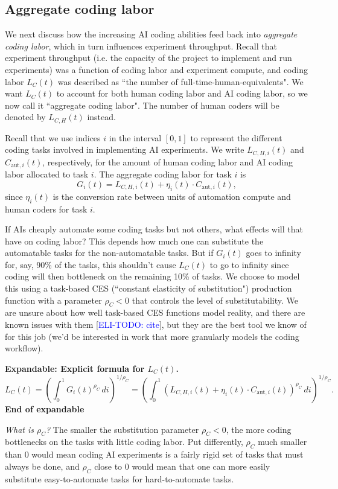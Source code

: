 \documentclass{article}
\theoremstyle{definition}
\newcommand{\ETODO}[1]{\textcolor{blue}{ELI-TODO: #1}}
\newcommand{\ESUG}[1]{\textcolor{purple}{ELI-SUGGESTION: #1}}
\newcommand{\ASUG}[1]{\textcolor{magenta}{ALEX-SUGGESTION: #1}}
\begin{document}
\subsection{Aggregate coding labor} \label{Aggregate coding labor}

We next discuss how the increasing AI coding abilities feed back into \textit{aggregate coding labor}, which in turn influences experiment throughput. Recall that experiment throughput (i.e. the capacity of the project to implement and run experiments) was a function of coding labor and experiment compute, and coding labor $L_C(t)$ was described as ``the number of full-time-human-equivalents". We want $L_C(t)$ to account for both human coding labor and AI coding labor, so we now call it ``aggregate coding labor". The number of human coders will be denoted by $L_{C,H}(t)$ instead.

Recall that we use indices $i$ in the interval $[0,1]$ to represent the different coding tasks involved in implementing AI experiments. We write $L_{C,H,i}(t)$ and $C_{\text{aut},i}(t)$, respectively, for the amount of human coding labor and AI coding labor allocated to task $i$. The aggregate coding labor for task $i$ is
\[ G_i(t) = L_{C,H,i}(t) + \eta_i(t) \cdot C_{\text{aut},i}(t),\]
since $\eta_i(t)$ is the conversion rate between units of automation compute and human coders for task $i$.

If AIs cheaply automate some coding tasks but not others, what effects will that have on coding labor? This depends how much one can substitute the automatable tasks for the non-automatable tasks. But if $G_i(t)$ goes to infinity for, say, 90\% of the tasks, this shouldn't cause $L_C(t)$ to go to infinity since coding will then bottleneck on the remaining 10\% of tasks. We choose to model this using a task-based CES (``constant elasticity of substitution") production function with a parameter $\rho_C < 0$ that controls the level of substitutability. We are unsure about how well task-based CES functions model reality, and there are known issues with them [\ETODO{cite}], but they are the best tool we know of for this job (we'd be interested in work that more granularly models the coding workflow).

\textbf{Expandable: Explicit formula for $L_C(t)$.}
\[ L_C(t) = \left( \int_0^1 G_i(t)^{\rho_C} \, di \right)^{1/\rho_C} = \left(\int_0^1 (L_{C,H,i}(t) + \eta_i(t) \cdot C_{\text{aut}, i}(t))^{\rho_C} \, di \right)^{1/\rho_C}.\]
\textbf{End of expandable}

\textit{What is $\rho_C$?} The smaller the substitution parameter $\rho_C < 0$, the more coding bottlenecks on the tasks with little coding labor. Put differently, $\rho_C$ much smaller than 0 would mean coding AI experiments is a fairly rigid set of tasks that must always be done, and $\rho_C$ close to 0 would mean that one can more easily substitute easy-to-automate tasks for hard-to-automate tasks. %
\end{document}
